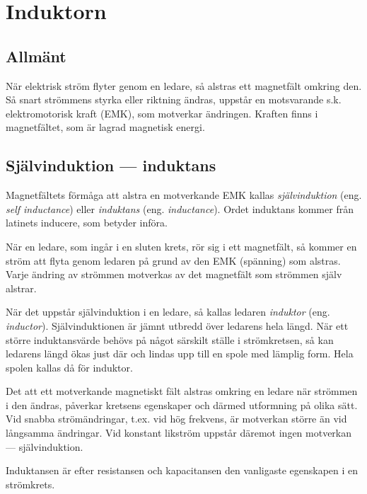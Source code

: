 \section{Induktorn}

\subsection{Allmänt}

När elektrisk ström flyter genom en ledare, så alstras ett magnetfält omkring
den. Så snart strömmens styrka eller riktning ändras, uppstår en motsvarande
s.k. elektromotorisk kraft (EMK), som motverkar ändringen. Kraften finns i
magnetfältet, som är lagrad magnetisk energi.

\subsection{Självinduktion --- induktans}

Magnetfältets förmåga att alstra en motverkande EMK kallas
\emph{självinduktion} (eng. \emph{self inductance}) eller
\emph{induktans} (eng. \emph{inductance}).
Ordet induktans kommer från latinets inducere, som betyder införa.

När en ledare, som ingår i en sluten krets, rör sig i ett magnetfält, så kommer
en ström att flyta genom ledaren på grund av den EMK (spänning) som alstras.
Varje ändring av strömmen motverkas av det magnetfält som strömmen själv
alstrar.

När det uppstår självinduktion i en ledare, så kallas ledaren \emph{induktor}
(eng. \emph{inductor}).
Självinduktionen är jämnt utbredd över ledarens hela längd. När ett större
induktansvärde behövs på något särskilt ställe i strömkretsen, så kan ledarens
längd ökas just där och lindas upp till en spole med lämplig form.
Hela spolen kallas då för induktor.

Det att ett motverkande magnetiskt fält alstras omkring en ledare när strömmen i
den ändras, påverkar kretsens egenskaper och därmed utformning på olika sätt.
Vid snabba strömändringar, t.ex. vid hög frekvens, är motverkan större än vid
långsamma ändringar.
Vid konstant likström uppstår däremot ingen motverkan --- självinduktion.

Induktansen är efter resistansen och kapacitansen den vanligaste egenskapen i
en strömkrets.

